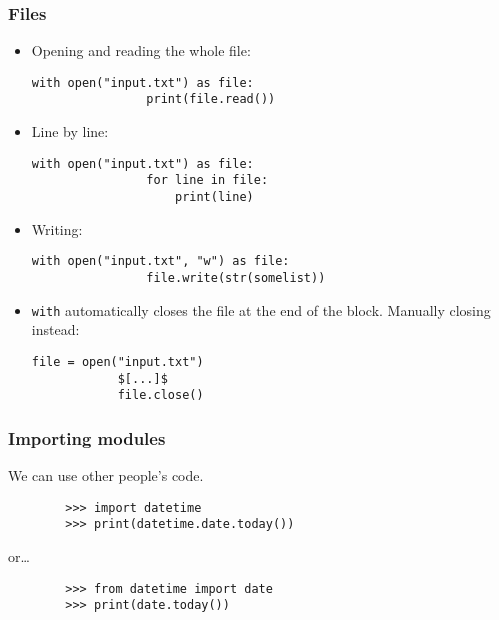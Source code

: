 \documentclass[presentation]{beamer}
\begin{document}
	\begin{frame}[fragile]
		\frametitle{Files}
		
		\begin{itemize}
			\item Opening and reading the whole file:
			\begin{lstlisting}[xleftmargin=\dimexpr-\leftmargini]
			with open("input.txt") as file:
			    print(file.read())
			\end{lstlisting}
			
			\pause
			
			\item Line by line:
			\begin{lstlisting}[xleftmargin=\dimexpr-\leftmargini]
			with open("input.txt") as file:
			    for line in file:
			        print(line)
			\end{lstlisting}
			
			\pause
			
			\item Writing:
			\begin{lstlisting}[xleftmargin=\dimexpr-\leftmargini]
			with open("input.txt", "w") as file:
			    file.write(str(somelist))
			\end{lstlisting}
			
			\pause
			
			\item \lstinline|with| automatically closes the file at the end of the block. Manually closing instead:
			
			\begin{lstlisting}[xleftmargin=\dimexpr-\leftmargini]
			file = open("input.txt")
			$[...]$
			file.close()
			\end{lstlisting}
		\end{itemize}
	\end{frame}
	
	\begin{frame}[fragile]
		\frametitle{Importing modules}
		We can use other people's code.
		\begin{lstlisting}
		>>> import datetime
		>>> print(datetime.date.today())
		\end{lstlisting}
		\pause
		or\dots
		\begin{lstlisting}
		>>> from datetime import date
		>>> print(date.today())
		\end{lstlisting}
	\end{frame}
\end{document}
